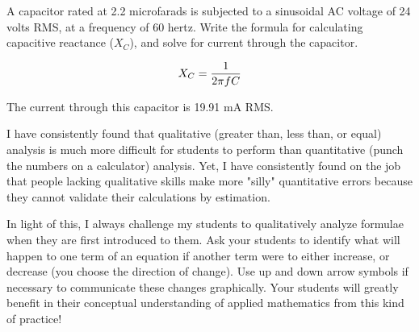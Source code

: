 

A capacitor rated at 2.2 microfarads is subjected to a sinusoidal AC voltage of 24 volts RMS, at a frequency of 60 hertz.  Write the formula for calculating capacitive reactance ($X_C$), and solve for current through the capacitor.







$$X_C = {1 \over {2 \pi f C}}$$

The current through this capacitor is 19.91 mA RMS.







I have consistently found that qualitative (greater than, less than, or equal) analysis is much more difficult for students to perform than quantitative (punch the numbers on a calculator) analysis.  Yet, I have consistently found on the job that people lacking qualitative skills make more "silly" quantitative errors because they cannot validate their calculations by estimation.

In light of this, I always challenge my students to qualitatively analyze formulae when they are first introduced to them.  Ask your students to identify what will happen to one term of an equation if another term were to either increase, or decrease (you choose the direction of change).  Use up and down arrow symbols if necessary to communicate these changes graphically.  Your students will greatly benefit in their conceptual understanding of applied mathematics from this kind of practice!



